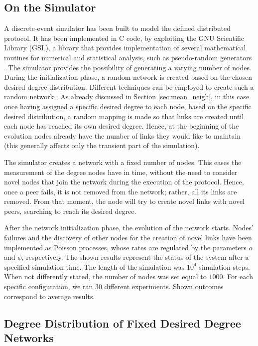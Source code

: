 \documentclass[a4paper,twosided]{article}
\begin{document}
\subsection{On the Simulator}

A discrete-event simulator has been built to model the defined distributed protocol. It has been implemented in C code, by exploiting the GNU Scientific Library (GSL), a library that provides implementation of several mathematical routines for numerical and statistical analysis, such as pseudo-random generators \cite{gsl}. The simulator provides the possibility of generating a varying number of nodes. During the initialization phase, a random network is created based on the chosen desired degree distribution. Different techniques can be employed to create such a random network \cite{newmanHandbook,simutools,BenderC78}. As already discussed in Section \ref{sec:mean_neigh}, in this case once having assigned a specific desired degree to each node, based on the specific desired distribution, a random mapping is made so that links are created until each node has reached its own desired degree.
Hence, at the beginning of the evolution nodes already have the number of links they would like to maintain (this generally affects only the transient part of the simulation).

The simulator creates a network with a fixed number of nodes. This eases the measurement of the degree nodes have in time, without the need to consider novel nodes that join the network during the execution of the protocol. Hence, once a peer fails, it is not removed from the network; rather, all its links are removed. From that moment, the node will try to create novel links with novel peers, searching to reach its desired degree.

After the network initialization phase, the evolution of the network starts. Nodes' failures and the discovery of other nodes for the creation of novel links have been implemented as Poisson processes, whose rates are regulated by the parameters $\alpha$ and $\phi$, respectively. 
The shown results represent the status of the system after a specified simulation time. The length of the simulation was $10^4$ simulation steps. When not differently stated, the number of nodes was set equal to $1000$. For each specific configuration, we ran $30$ different experiments. Shown outcomes correspond to average results.

\subsection{Degree Distribution of Fixed Desired Degree Networks}
\end{document}
